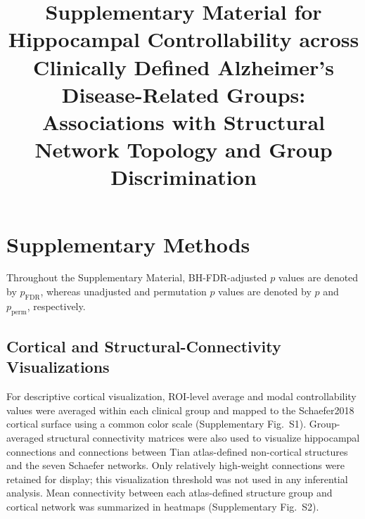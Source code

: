 \documentclass{article}
\title{Supplementary Material for Hippocampal Controllability across Clinically Defined Alzheimer's Disease-Related Groups: Associations with Structural Network Topology and Group Discrimination}
\author{}
\date{}
\begin{document}
\maketitle

\section{Supplementary Methods}

Throughout the Supplementary Material, BH-FDR-adjusted \(p\) values are denoted by \(p_{\mathrm{FDR}}\), whereas unadjusted and permutation \(p\) values are denoted by \(p\) and \(p_{\mathrm{perm}}\), respectively.

\subsection{Cortical and Structural-Connectivity Visualizations}
For descriptive cortical visualization, ROI-level average and modal controllability values were averaged within each clinical group and mapped to the Schaefer2018 cortical surface using a common color scale (Supplementary Fig.~S1). Group-averaged structural connectivity matrices were also used to visualize hippocampal connections and connections between Tian atlas-defined non-cortical structures and the seven Schaefer networks. Only relatively high-weight connections were retained for display; this visualization threshold was not used in any inferential analysis. Mean connectivity between each atlas-defined structure group and cortical network was summarized in heatmaps (Supplementary Fig.~S2).
\end{document}
